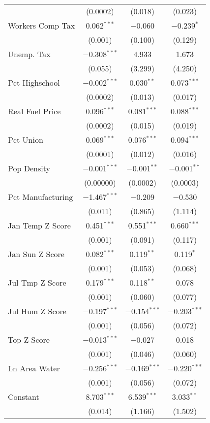\begin{table}[!htbp]
\begin{tabular}{@{\extracolsep{5pt}}lccc}
  & (0.0002) & (0.018) & (0.023) \\ 
  Workers Comp Tax & 0.062$^{***}$ & $-$0.060 & $-$0.239$^{*}$ \\ 
  & (0.001) & (0.100) & (0.129) \\ 
  Unemp. Tax & $-$0.308$^{***}$ & 4.933 & 1.673 \\ 
  & (0.055) & (3.299) & (4.250) \\ 
  Pct Highschool & $-$0.002$^{***}$ & 0.030$^{**}$ & 0.073$^{***}$ \\ 
  & (0.0002) & (0.013) & (0.017) \\ 
  Real Fuel Price & 0.096$^{***}$ & 0.081$^{***}$ & 0.088$^{***}$ \\ 
  & (0.0002) & (0.015) & (0.019) \\ 
  Pct Union & 0.069$^{***}$ & 0.076$^{***}$ & 0.094$^{***}$ \\ 
  & (0.0001) & (0.012) & (0.016) \\ 
  Pop Density & $-$0.001$^{***}$ & $-$0.001$^{**}$ & $-$0.001$^{**}$ \\ 
  & (0.00000) & (0.0002) & (0.0003) \\ 
  Pct Manufacturing & $-$1.467$^{***}$ & $-$0.209 & $-$0.530 \\ 
  & (0.011) & (0.865) & (1.114) \\ 
  Jan Temp Z Score & 0.451$^{***}$ & 0.551$^{***}$ & 0.660$^{***}$ \\ 
  & (0.001) & (0.091) & (0.117) \\ 
  Jan Sun Z Score & 0.082$^{***}$ & 0.119$^{**}$ & 0.119$^{*}$ \\ 
  & (0.001) & (0.053) & (0.068) \\ 
  Jul Tmp Z Score & 0.179$^{***}$ & 0.118$^{**}$ & 0.078 \\ 
  & (0.001) & (0.060) & (0.077) \\ 
  Jul Hum Z Score & $-$0.197$^{***}$ & $-$0.154$^{***}$ & $-$0.203$^{***}$ \\ 
  & (0.001) & (0.056) & (0.072) \\ 
  Top Z Score & $-$0.013$^{***}$ & $-$0.027 & 0.018 \\ 
  & (0.001) & (0.046) & (0.060) \\ 
  Ln Area Water & $-$0.256$^{***}$ & $-$0.169$^{***}$ & $-$0.220$^{***}$ \\ 
  & (0.001) & (0.056) & (0.072) \\ 
  Constant & 8.703$^{***}$ & 6.539$^{***}$ & 3.033$^{**}$ \\ 
  & (0.014) & (1.166) & (1.502) \\ 

\end{tabular}
\end{table}
